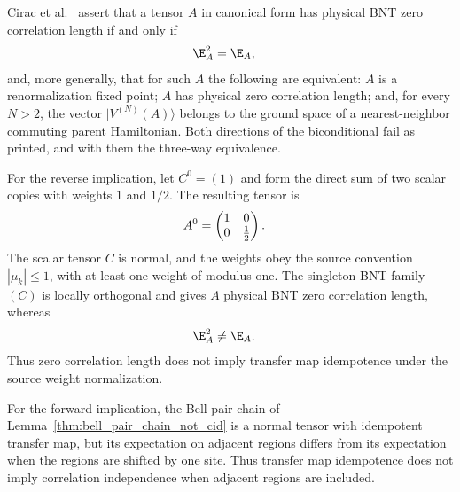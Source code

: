 \begin{lemma}
    \label{thm:cpsv_theorem_zcl_pure_status}
    \notready
    Cirac et al.~\cite[Theorems~3.8 and~3.10]{Cirac2016MPDO_arXiv} assert that a
    tensor $A$ in canonical form has physical BNT zero correlation length if and
    only if
    \begin{align}
        \E_A^2 & =\E_A,
        \notag
    \end{align}
    and, more generally, that for such $A$ the following are equivalent: $A$ is
    a renormalization fixed point; $A$ has physical zero correlation length;
    and, for every $N>2$, the vector $|V^{(N)}(A)\rangle$ belongs to the ground
    space of a nearest-neighbor commuting parent Hamiltonian. Both directions of
    the biconditional fail as printed, and with them the three-way equivalence.

    For the reverse implication, let $C^0=(1)$ and form the direct sum of two
    scalar copies with weights $1$ and $1/2$. The resulting tensor is
    \begin{align}
        A^0
         & =\begin{pmatrix}1&0\\0&\tfrac12\end{pmatrix}.
        \notag
    \end{align}
    The scalar tensor $C$ is normal, and the weights obey the source convention
    $|\mu_k|\leq 1$, with at least one weight of modulus one. The singleton BNT
    family $(C)$ is locally orthogonal and gives $A$ physical BNT zero
    correlation length, whereas
    \begin{align}
        \E_A^2 & \neq\E_A.
        \notag
    \end{align}
    Thus zero correlation length does not imply transfer map idempotence under
    the source weight normalization.

    For the forward implication, the Bell-pair chain of
    Lemma~\ref{thm:bell_pair_chain_not_cid} is a normal tensor with idempotent
    transfer map, but its expectation on adjacent regions differs from its
    expectation when the regions are shifted by one site. Thus transfer map
    idempotence does not imply correlation independence when adjacent regions are
    included.


\end{lemma}
